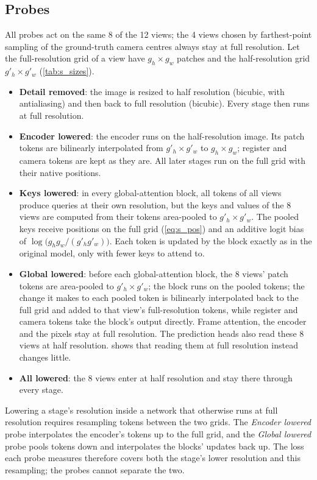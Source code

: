 \documentclass[10pt,twocolumn,letterpaper]{article}
\begin{document}
\subsection{Probes}
All probes act on the same 8 of the 12 views; the 4 views chosen by farthest-point sampling of the ground-truth camera centres always stay at full resolution. Let the full-resolution grid of a view have $g_h\times g_w$ patches and the half-resolution grid $g'_h\times g'_w$ (\cref{tab:s_sizes}).
\begin{itemize}[nosep,leftmargin=*]
  \item \textbf{Detail removed}: the image is resized to half resolution (bicubic, with antialiasing) and then back to full resolution (bicubic). Every stage then runs at full resolution.
  \item \textbf{Encoder lowered}: the encoder runs on the half-resolution image. Its patch tokens are bilinearly interpolated from $g'_h\times g'_w$ to $g_h\times g_w$; register and camera tokens are kept as they are. All later stages run on the full grid with their native positions.
  \item \textbf{Keys lowered}: in every global-attention block, all tokens of all views produce queries at their own resolution, but the keys and values of the 8 views are computed from their tokens area-pooled to $g'_h\times g'_w$. The pooled keys receive positions on the full grid (\cref{eq:s_pos}) and an additive logit bias of $\log\big(g_hg_w/(g'_hg'_w)\big)$. Each token is updated by the block exactly as in the original model, only with fewer keys to attend to.
  \item \textbf{Global lowered}: before each global-attention block, the 8 views' patch tokens are area-pooled to $g'_h\times g'_w$; the block runs on the pooled tokens; the change it makes to each pooled token is bilinearly interpolated back to the full grid and added to that view's full-resolution tokens, while register and camera tokens take the block's output directly. Frame attention, the encoder and the pixels stay at full resolution. The prediction heads also read these 8 views at half resolution.  shows that reading them at full resolution instead changes little.
  \item \textbf{All lowered}: the 8 views enter at half resolution and stay there through every stage.
\end{itemize}

Lowering a stage's resolution inside a network that otherwise runs at full resolution requires resampling tokens between the two grids. The \emph{Encoder lowered} probe interpolates the encoder's tokens up to the full grid, and the \emph{Global lowered} probe pools tokens down and interpolates the blocks' updates back up. The loss each probe measures therefore covers both the stage's lower resolution and this resampling; the probes cannot separate the two.
\end{document}
